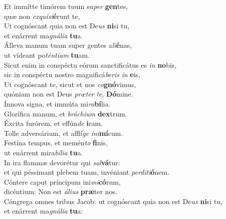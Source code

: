 \evenverse Et immítte timórem tuum su\textit{per} \textbf{gen}tes,~\*\\
\evenverse quæ non \textit{ex}\textit{qui}\textit{si}\textbf{é}runt te,\\
\oddverse Ut cognóscant quia non est De\textit{us} \textbf{ni}si tu,~\*\\
\oddverse et enárrent ma\textit{gná}\textit{li}\textit{a} \textbf{tu}a.\\
\evenverse Álleva manum tuam super gentes a\textit{li}\textbf{é}nas,~\*\\
\evenverse ut vídeant po\textit{tén}\textit{ti}\textit{am} \textbf{tu}am.\\
\oddverse Sicut enim in conspéctu eórum sanctificátus es \textit{in} \textbf{no}bis,~\*\\
\oddverse sic in conspéctu nostro magnificá\textit{be}\textit{ris} \textit{in} \textbf{e}is,\\
\evenverse Ut cognóscant te, sicut et nos \textit{co}\textbf{gnó}vimus,~\*\\
\evenverse quóniam non est Deus \textit{præ}\textit{ter} \textit{te}, \textbf{Dó}mine.\\
\oddverse Ínnova signa, et immúta mi\textit{ra}\textbf{bí}lia.~\*\\
\oddverse Glorífica manum, et \textit{brá}\textit{chi}\textit{um} \textbf{dex}trum.\\
\evenverse Éxcita furórem, et effún\textit{de} \textbf{i}ram.~\*\\
\evenverse Tolle adversárium, et afflí\textit{ge} \textit{i}\textit{ni}\textbf{mí}cum.\\
\oddverse Festína tempus, et memén\textit{to} \textbf{fi}nis,~\*\\
\oddverse ut enárrent mira\textit{bí}\textit{li}\textit{a} \textbf{tu}a.\\
\evenverse In ira flammæ devorétur qui \textit{sal}\textbf{vá}tur:~\*\\
\evenverse et qui péssimant plebem tuam, invéniant \textit{per}\textit{di}\textit{ti}\textbf{ó}nem.\\
\oddverse Cóntere caput príncipum ini\textit{mi}\textbf{có}rum,~\*\\
\oddverse dicéntium: Non est \textit{á}\textit{li}\textit{us} \textbf{præ}ter nos.\\
\evenverse Cóngrega omnes tribus Jacob: ut cognóscant quia non est De\textit{us} \textbf{ni}si tu,~\*\\
\evenverse et enárrent ma\textit{gná}\textit{li}\textit{a} \textbf{tu}a:\\
